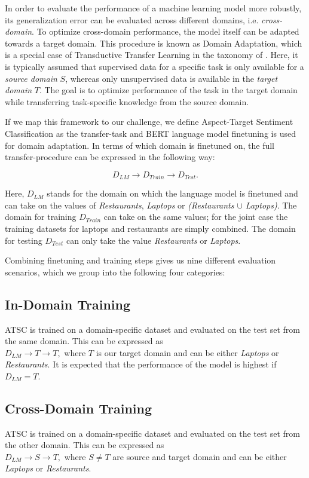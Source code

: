 \documentclass[11pt,a4paper]{article}
\begin{document}
In order to evaluate the performance of a machine learning model more robustly,
its generalization error can be evaluated across different domains, i.e. \textit{cross-domain}. To optimize cross-domain performance, the model itself can be adapted towards a target domain. This procedure is known as Domain Adaptation, which is a special case of Transductive Transfer Learning in the taxonomy of \citet{Ruder2019}. Here, it is typically assumed that supervised data for a specific task is only available for a \textit{source domain} $S$, whereas only unsupervised data is available in the \textit{target domain} $T$. The goal is to optimize performance of the task in the target domain while transferring task-specific knowledge from the source domain.

If we map this framework to our challenge, we define Aspect-Target Sentiment Classification as the transfer-task and BERT language model finetuning is used for domain adaptation. In terms of which domain is finetuned on, the full transfer-procedure can be expressed in the following way:

\[ D_{LM} \rightarrow D_{Train} \rightarrow D_{Test}. \]

Here, $D_{LM}$ stands for the domain on which the language model is finetuned and can take on the values of \textit{Restaurants}, \textit{Laptops} or \textit{(Restaurants $\cup$ Laptops)}.
The domain for training $D_{Train}$ can take on the same values; for the joint case the training datasets for laptops and restaurants are simply combined.
The domain for testing $D_{Test}$ can only take the value \textit{Restaurants} or \textit{Laptops}.


Combining finetuning and training steps gives us nine different evaluation scenarios, which we group into the following four categories: 

\subsection*{In-Domain Training} 
ATSC is trained on a domain-specific dataset and evaluated on the test set from the same domain. This can be expressed as \\$D_{LM} \rightarrow T \rightarrow T,$ where $T$ is our target domain and can be either \textit{Laptops} or \textit{Restaurants}. It is expected that the performance of the model is highest if $D_{LM} = T$.

\subsection*{Cross-Domain Training}
ATSC is trained on a domain-specific dataset and evaluated on the test set from the other domain. This can be expressed as \\$D_{LM} \rightarrow S \rightarrow T,$ where $S\neq T$ are source and target domain and can be either \textit{Laptops} or \textit{Restaurants}.
\end{document}

